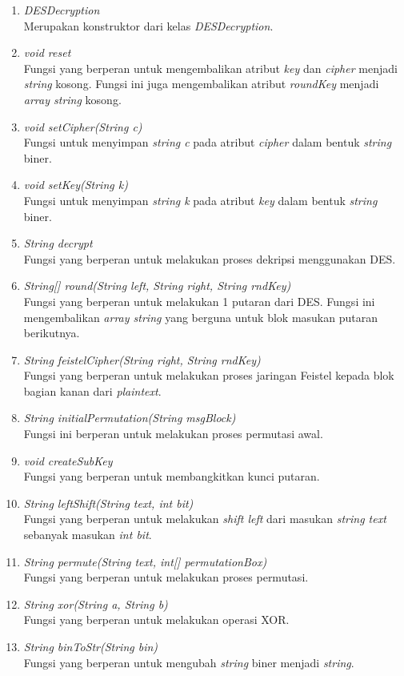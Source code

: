 \begin{enumerate}
	\item \textit{DESDecryption} \\
	Merupakan konstruktor dari kelas \textit{DESDecryption}.
	\item \textit{void reset} \\
	Fungsi yang berperan untuk mengembalikan atribut \textit{key} dan \textit{cipher} menjadi \textit{string} kosong. Fungsi ini juga mengembalikan atribut \textit{roundKey} menjadi \textit{array string} kosong.
	\item \textit{void setCipher(String c)} \\
	Fungsi untuk menyimpan \textit{string c} pada atribut \textit{cipher} dalam bentuk \textit{string} biner.
	\item \textit{void setKey(String k)} \\
	Fungsi untuk menyimpan \textit{string k} pada atribut \textit{key} dalam bentuk \textit{string} biner.
	\item \textit{String decrypt} \\
	Fungsi yang berperan untuk melakukan proses dekripsi menggunakan DES.
	\item \textit{String[] round(String left, String right, String rndKey)} \\
	Fungsi yang berperan untuk melakukan 1 putaran dari DES. Fungsi ini mengembalikan \textit{array string} yang berguna untuk blok masukan putaran berikutnya.
	\item \textit{String feistelCipher(String right, String rndKey)} \\
	Fungsi yang berperan untuk melakukan proses jaringan Feistel kepada blok bagian kanan dari \textit{plaintext}.
	\item \textit{String initialPermutation(String msgBlock)} \\
	Fungsi ini berperan untuk melakukan proses permutasi awal.
	\item \textit{void createSubKey} \\
	Fungsi yang berperan untuk membangkitkan kunci putaran.
	\item \textit{String leftShift(String text, int bit)} \\
	Fungsi yang berperan untuk melakukan \textit{shift left} dari masukan \textit{string text} sebanyak masukan \textit{int bit}.
	\item \textit{String permute(String text, int[] permutationBox)} \\
	Fungsi yang berperan untuk melakukan proses permutasi.
	\item \textit{String xor(String a, String b)} \\
	Fungsi yang berperan untuk melakukan operasi XOR.
	\item \textit{String binToStr(String bin)} \\
	Fungsi yang berperan untuk mengubah \textit{string} biner menjadi \textit{string}.
\end{enumerate}


